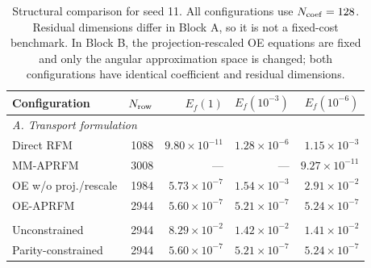 \begin{table}[t]
\centering
\caption{Structural comparison for seed 11. All configurations use $N_{\rm coef}=128$. Residual dimensions differ in Block A, so it is not a fixed-cost benchmark. In Block B, the projection-rescaled OE equations are fixed and only the angular approximation space is changed; both configurations have identical coefficient and residual dimensions.}
\label{tab:mechanism}
\begin{tabular}{lrrrr}
\toprule
Configuration & $N_{\rm row}$ & $E_f(1)$ & $E_f(10^{-3})$ & $E_f(10^{-6})$\\
\midrule
\multicolumn{5}{l}{\emph{A. Transport formulation}}\\
\addlinespace
Direct RFM & 1088 & $9.80\times10^{-11}$ & $1.28\times10^{-6}$ & $1.15\times10^{-3}$\\
MM-APRFM & 3008 & --- & --- & $9.27\times10^{-11}$\\
OE w/o proj./rescale & 1984 & $5.73\times10^{-7}$ & $1.54\times10^{-3}$ & $2.91\times10^{-2}$\\
OE-APRFM & 2944 & $5.60\times10^{-7}$ & $5.21\times10^{-7}$ & $5.24\times10^{-7}$\\
\addlinespace
\multicolumn{5}{l}{\emph{B. Angular approximation space}}\\
\addlinespace
Unconstrained & 2944 & $8.29\times10^{-2}$ & $1.42\times10^{-2}$ & $1.41\times10^{-2}$\\
Parity-constrained & 2944 & $5.60\times10^{-7}$ & $5.21\times10^{-7}$ & $5.24\times10^{-7}$\\
\bottomrule
\end{tabular}
\end{table}

